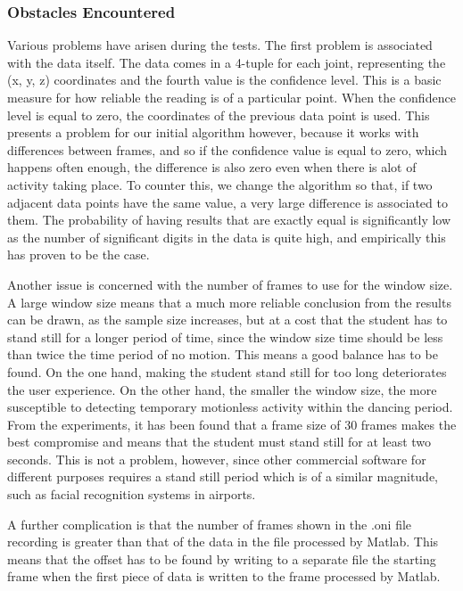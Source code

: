 \documentclass[11pt,a4paper]{article}
\begin{document}
\subsubsection{Obstacles Encountered}
\noindent
Various problems have arisen during the tests. The first problem is associated with the data itself. The data comes in a 4-tuple for each joint, representing the (x, y, z) coordinates and the fourth value is the confidence level. This is a basic measure for how reliable the reading is of a particular point. When the confidence level is equal to zero, the coordinates of the previous data point is used. This presents a problem for our initial algorithm however, because it works with differences between frames, and so if the confidence value is equal to zero, which happens often enough, the difference is also zero even when there is alot of activity taking place. To counter this, we change the algorithm so that, if two adjacent data points have the same value, a very large difference is associated to them. The probability of having results that are exactly equal is significantly low as the number of significant digits in the data is quite high, and empirically this has proven to be the case. 

\noindent
Another issue is concerned with the number of frames to use for the window size. A large window size means that a much more reliable conclusion from the results can be drawn, as the sample size increases, but at a cost that the student has to stand still for a longer period of time, since the window size time should be less than twice the time period of no motion. This means a good balance has to be found. On the one hand, making the student stand still for too long deteriorates the user experience. On the other hand, the smaller the window size, the more susceptible to detecting temporary motionless activity within the dancing period. From the experiments, it has been found that a frame size of 30 frames makes the best compromise and means that the student must stand still for at least two seconds. This is not a problem, however, since other commercial software for different purposes requires a stand still period which is of a similar magnitude, such as facial recognition systems in airports.  

\noindent
A further complication is that the number of frames shown in the .oni file recording is greater than that of the data in the file processed by Matlab. This means that the offset has to be found by writing to a separate file the starting frame when the first piece of data is written to the frame processed by Matlab. 
\end{document}
